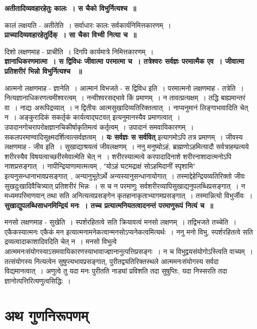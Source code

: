 {\bfseries अतीतादिव्यवहारहेतुः कालः~। स चैको विभुर्नित्यश्च~॥}\par
	कालं लक्षयति - अतीतेति~। सर्वाधारः कालः सर्वकार्यनिमित्तकारणम्~।\\[10pt]
\noindent
{\bfseries प्राच्यादिव्यवहारहेतुर्दिक्~। सा चैका विभ्वी नित्या च~॥}\par
	दिशो लक्षणमाह - प्राचीति~। दिगपि कार्यमात्रे निमित्तकारणम्~।\\[10pt]
{\bfseries ज्ञानाधिकरणमात्मा~। स द्विविधः जीवात्मा परमात्मा च~। तत्रेश्वरः सर्वज्ञः परमात्मैक एव~। जीवात्मा प्रतिशरीरं भिन्नो विभुर्नित्यश्च ~॥}\par
	आत्मनो लक्षणमाह - ज्ञानेति~। आत्मानं विभजते - स द्विविध इति~। परमात्मनो लक्षणमाह - तत्रेति~। नित्यज्ञानाधिकरणत्वमीश्वरत्वम्~। नन्वीश्वरसद्भावे किं प्रमाणम्~। न तावत्प्रत्यक्षम्~। तद्धि बाह्यमान्तरं वा~। नाद्यः अरूपिद्रव्यात्~। न द्वितीयः आत्मसुखादिव्यतिरिक्तत्वात्~। नाप्यनुमानं लिङ्गाभावादिति चेत् न~। अङ्कुरादिकं सकर्तृकं कार्यत्वाद्घटवत् इत्यनुमानस्यैव प्रमाणत्वात्~। उपादानगोचरापरोक्षज्ञानचिकीर्षाकृतिमत्वं कर्तृत्वम्~। उपादानं समवायिकारणम्~। सकलपरमाण्वादिसूक्ष्मदर्शित्वात्सर्वज्ञत्वम्~। {\bfseries यः सर्वज्ञः स सर्ववित्} इत्यागमोऽपि तत्र प्रमाणम्~। जीवस्य लक्षणमाह - जीव इति~। सुखाद्याश्रयत्वं जीवलक्षणम्~। ननु मनुष्योऽहं, ब्राह्मणोऽहमित्यादौ सर्वत्राहम्प्रत्यये शरीरस्यैव विषयत्वाच्छरीरमेवात्मेति चेत् न~। शरीरस्यात्मत्वे करपादादिनाशे शरीरनाशादात्मनोऽपि नाशप्रसङ्गात्~। नापीन्द्रियाणामात्मत्वम् , "योऽहं घटमद्राक्षं सोऽहमिदानीं स्पृशामि" इत्यनुसन्धानाभावप्रसङ्गात्~, अन्यानुभूतेऽर्थे अन्यस्यानुसन्धानायोगात्~। तस्माद्देहेन्द्रियव्यतिरिक्तो जीवः सुखदुःखादिवैचित्र्यात् प्रतिशरीरं भिन्नः~। स च न परमाणुः सर्वशरीरव्यापिसुखाद्यनुपलब्धिप्रसङ्गात्~। न मध्यमपरिमाणवान् तथा सति अनित्यत्वप्रसङ्गेन कृतहानाकृताभ्यागमप्रसङ्गात्~। तस्मान्नित्यो विभुर्जीवः~।\\[10pt]
{\bfseries सुखाद्युपलब्धिसाधनमिन्द्रियं मनः~। तच्च प्रत्यात्मनियतत्वादनन्तं परमाणुरूपं नित्यं च~॥}\par
	मनसो लक्षणमाह - सुखेति~। स्पर्शरहितत्वे सति क्रियावत्वं मनसो लक्षणम्~। तद्विभजते तच्चेति~। एकैकस्यात्मनः एकैकं मन इत्यात्मनामनेकत्वान्मनसोऽप्यनेकत्वमित्यर्थः~। ननु मनो विभु, स्पर्शरहितत्वे सति द्रव्यत्वादाकाशादिवदिति चेत् न~। मनसो विभुत्वे आत्ममनःसंयोगस्याऽसमवायिकारणस्याभावाज्ज्ञानानुत्पत्तिप्रसङ्गः~। न च विभुद्वयसंयोगोऽस्त्विति वाच्यम्~। तत्संयोगस्य नित्यत्वेन सुषुप्त्यभावप्रसङ्गात्, पुरीतद्व्यतिरिक्तस्थले आत्ममनःसंयोगस्य सर्वदा विद्यमानत्वात्~। अणुत्वे तु यदा मनः पुरीतति नाड्यां प्रविशति तदा सुषुप्तिः, यदा निस्सरति तदा ज्ञानोत्पत्तिरित्यणुत्वसिद्धिः~। \section*{अथ गुणनिरूपणम्}
